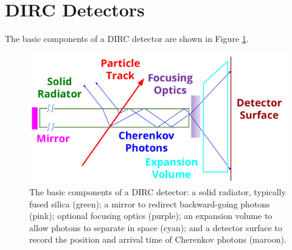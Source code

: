 \section{DIRC Detectors}
The basic components of a DIRC detector are shown in Figure \ref{fig:dircbasics}.

\begin{figure}[ht]
	\centering
	\includegraphics[scale=0.7]{figures/DIRC_components.pdf}
	\caption{The basic components of a DIRC detector: a solid radiator, typically fused silica (green); a mirror to redirect backward-going photons (pink); optional focusing optics (purple); an expansion volume to allow photons to separate in space (cyan); and a detector surface to record the position and arrival time of Cherenkov photons (maroon).}
	\label{fig:dircbasics}
\end{figure}
